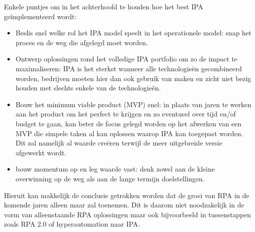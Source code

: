 Enkele puntjes om in het achterhoofd te houden hoe het best IPA geïmplementeerd wordt:
\begin{itemize}
	\item Beslis snel welke rol het IPA model speelt in het operationele model: snap het proces en de weg die afgelegd moet worden.
	\item Ontwerp oplossingen rond het volledige IPA portfolio om zo de impact te maximaliseren: IPA is het sterkst wanneer alle technologieën gecombineerd worden, bedrijven moeten hier dan ook gebruik van maken en zicht niet bezig houden met slechts enkele van de technologieën.
	\item Bouw het minimum viable product (MVP) snel: in plaats van jaren te werken aan het product om het perfect te krijgen en zo eventueel over tijd en/of budget te gaan, kan beter de focus gelegd worden op het afwerken van een MVP die simpele taken al kan oplossen waarop IPA kan toegepast worden. Dit zal namelijk al waarde creëren terwijl de meer uitgebreide versie afgewerkt wordt.
	\item bouw momentum op en leg waarde vast: denk zowel aan de kleine overwinning op de weg als aan de  lange termijn doelstellingen.
\end{itemize} \autocite{everythingIPA}

Hieruit kan makkelijk de conclusie getrokken worden dat de groei van RPA in de komende jaren alleen maar zal toenemen. Dit is daarom niet noodzakelijk in de vorm van alleenstaande RPA oplossingen maar ook bijvoorbeeld in tussenstappen zoals RPA 2.0 of hyperautomation naar IPA.